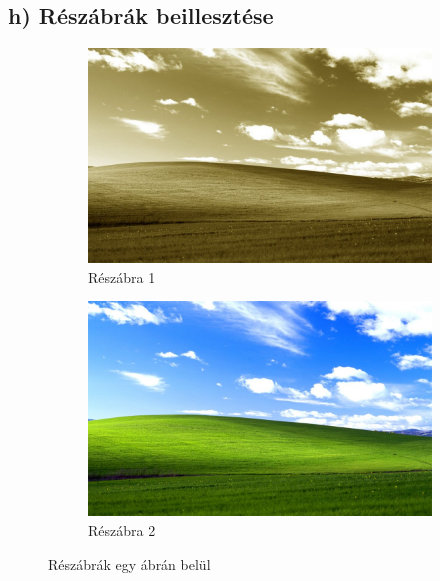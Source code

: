 \documentclass[a4paper,12pt]{article}
\begin{document}
\subsection{h) Részábrák beillesztése}
\begin{figure}[h]
    \centering
    \begin{subfigure}{0.45\textwidth}
        \includegraphics[width=\linewidth]{szepia.jpg}
        \caption{Részábra 1}
        \label{subfig1}
    \end{subfigure}
    \hfill
    \begin{subfigure}{0.45\textwidth}
        \includegraphics[width=\linewidth]{szines.jpg}
        \caption{Részábra 2}
        \label{subfig2}
    \end{subfigure}
    \caption{Részábrák egy ábrán belül}
    \label{fig:main_figure}
\end{figure}
\end{document}

